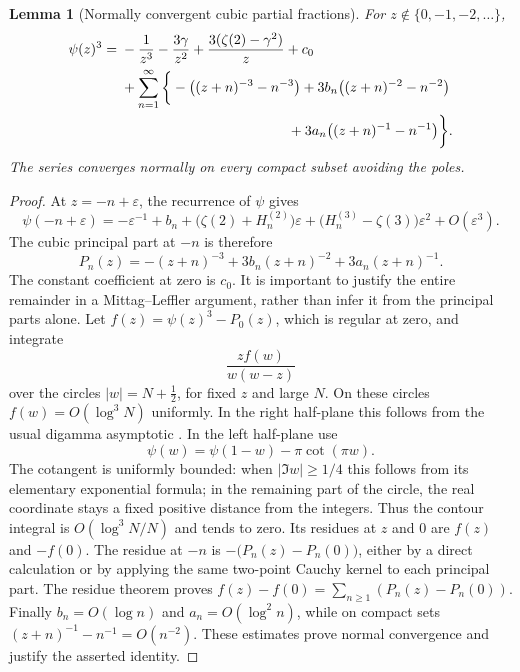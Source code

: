 \documentclass[11pt]{article}
\numberwithin{equation}{section}
\newtheorem{lemma}[theorem]{Lemma}
\theoremstyle{definition}
\theoremstyle{remark}
\begin{document}
\begin{lemma}[Normally convergent cubic partial fractions]
\label{bridge:ML}
For $z\notin\{0,-1,-2,\ldots\}$,
\begin{align}
 \psi(z)^3={}&-\frac1{z^3}-\frac{3\gamma}{z^2}
       +\frac{3(\zeta(2)-\gamma^2)}z+c_0\notag\\
 &+\sum_{n=1}^{\infty}\bigg\{
      -\bigl((z+n)^{-3}-n^{-3}\bigr)
      +3b_n\bigl((z+n)^{-2}-n^{-2}\bigr)\notag\\
 &\hspace{42mm}+3a_n\bigl((z+n)^{-1}-n^{-1}\bigr)\bigg\}.
 \label{bridge:MLformula}
\end{align}
The series converges normally on every compact subset avoiding the poles.
\end{lemma}

\begin{proof}
At $z=-n+\varepsilon$, the recurrence of $\psi$ gives
\[
 \psi(-n+\varepsilon)
   =-\varepsilon^{-1}+b_n+
      \bigl(\zeta(2)+H_n^{(2)}\bigr)\varepsilon
      +\bigl(H_n^{(3)}-\zeta(3)\bigr)\varepsilon^2
      +O(\varepsilon^3).
\]
The cubic principal part at $-n$ is therefore
\[
 P_n(z)=-(z+n)^{-3}+3b_n(z+n)^{-2}+3a_n(z+n)^{-1}.
\]
The constant coefficient at zero is $c_0$.
It is important to justify the entire remainder in a Mittag--Leffler
argument, rather than infer it from the principal parts alone.
Let $f(z)=\psi(z)^3-P_0(z)$, which is regular at zero, and integrate
\[
 \frac{z f(w)}{w(w-z)}
\]
over the circles $|w|=N+\tfrac12$, for fixed $z$ and large $N$.
On these circles $f(w)=O(\log^3 N)$ uniformly.  In the right
half-plane this follows from the usual digamma asymptotic \cite[Sections~5.7, 5.11]{DLMFgamma}.  In the
left half-plane use
\[
 \psi(w)=\psi(1-w)-\pi\cot(\pi w).
\]
The cotangent is uniformly bounded: when $|\Im w|\ge1/4$ this follows
from its elementary exponential formula; in the remaining part of the
circle, the real coordinate stays a fixed positive distance from the
integers.  Thus the contour integral is
$O(\log^3 N/N)$ and tends to zero.
Its residues at $z$ and $0$ are $f(z)$ and $-f(0)$.
The residue at $-n$ is $-\bigl(P_n(z)-P_n(0)\bigr)$, either by a
direct calculation or by applying the same two-point Cauchy kernel to
each principal part.  The residue theorem proves
$f(z)-f(0)=\sum_{n\ge1}(P_n(z)-P_n(0))$.
Finally $b_n=O(\log n)$ and $a_n=O(\log^2 n)$, while on compact sets
$(z+n)^{-1}-n^{-1}=O(n^{-2})$.  These estimates prove normal
convergence and justify the asserted identity.
\end{proof}
\end{document}

